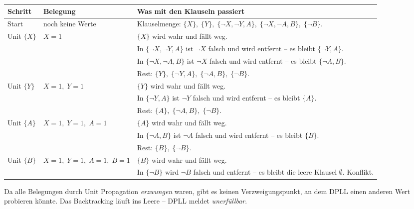 \documentclass[a4paper,12pt]{article}
\begin{document}
\begin{center}
\small
\renewcommand{\arraystretch}{1.3}
\begin{tabular}{p{}p{}p{}}
\toprule
Schritt & Belegung & Was mit den Klauseln passiert \\
\midrule
Start
& noch keine Werte
& Klauselmenge: $\{X\},\;\{Y\},\;\{\neg X, \neg Y, A\},\;\{\neg X, \neg A, B\},\;\{\neg B\}$. \\
\midrule
Unit $\{X\}$
& $X = 1$
& $\{X\}$ wird wahr und f\"allt weg.\\
&& In $\{\neg X, \neg Y, A\}$ ist $\neg X$ falsch und wird entfernt -- es bleibt $\{\neg Y, A\}$.\\
&& In $\{\neg X, \neg A, B\}$ ist $\neg X$ falsch und wird entfernt -- es bleibt $\{\neg A, B\}$.\\
&& Rest: $\{Y\},\;\{\neg Y, A\},\;\{\neg A, B\},\;\{\neg B\}$. \\
\midrule
Unit $\{Y\}$
& $X = 1,\; Y = 1$
& $\{Y\}$ wird wahr und f\"allt weg.\\
&& In $\{\neg Y, A\}$ ist $\neg Y$ falsch und wird entfernt -- es bleibt $\{A\}$.\\
&& Rest: $\{A\},\;\{\neg A, B\},\;\{\neg B\}$. \\
\midrule
Unit $\{A\}$
& $X = 1,\; Y = 1,\; A = 1$
& $\{A\}$ wird wahr und f\"allt weg.\\
&& In $\{\neg A, B\}$ ist $\neg A$ falsch und wird entfernt -- es bleibt $\{B\}$.\\
&& Rest: $\{B\},\;\{\neg B\}$. \\
\midrule
Unit $\{B\}$
& $X = 1,\; Y = 1,\; A = 1,\; B = 1$
& $\{B\}$ wird wahr und f\"allt weg.\\
&& In $\{\neg B\}$ wird $\neg B$ falsch und entfernt -- es bleibt die leere Klausel $\emptyset$. Konflikt. \\
\bottomrule
\end{tabular}
\end{center}

Da alle Belegungen durch Unit Propagation \emph{erzwungen} waren, gibt es
keinen Verzweigungspunkt, an dem DPLL einen anderen Wert probieren
k\"onnte. Das Backtracking l\"auft ins Leere -- DPLL meldet
\emph{unerf\"ullbar}.

\medskip
\noindent{}
\end{document}
